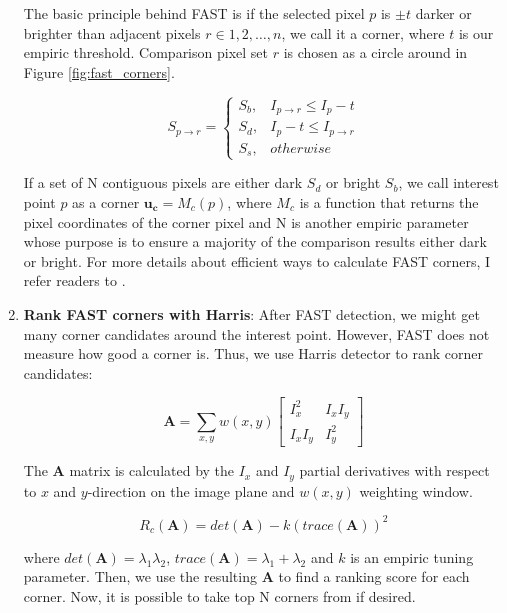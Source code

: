 \documentclass[12pt]{report}
\numberwithin{figure}{section}
\begin{document}
\begin{appendices}
\begin{enumerate}
	The basic principle behind FAST is if the selected pixel $p$ is $\pm t$ 
	darker or brighter than adjacent pixels $r\in{1,2,\dots,n}$, we call it a 
	corner, where $t$ is our empiric threshold. Comparison pixel set $r$ is 
	chosen as a circle around in Figure \ref{fig:fast_corners}.
	
	\begin{equation}
	S_{p \rightarrow r} = 
	\begin{cases}
	S_b, & I_{p \rightarrow r} \leq I_p - t \\
	S_d, & I_p - t \leq I_{p \rightarrow r} \\
	S_s, & otherwise
	\end{cases}
	\end{equation}
	
	If a set of N contiguous pixels are either dark $S_d$ or bright $S_b$, we 
	call interest point $p$ as a corner $\mathbf{u_c} = M_c(p)$, where $M_c$ 
	is a function that returns the pixel coordinates of the corner pixel and N 
	is another empiric parameter whose purpose is to ensure a majority of the 
	comparison results either dark or bright. For more details about efficient 
	ways to 
	calculate FAST corners, I refer readers to \parencite{Rosten2006}.
	
	\item \textbf{Rank FAST corners with Harris}: After FAST detection, we 
	might get many corner candidates around the interest point. However, FAST 
	does not measure how good a corner is. Thus, we use Harris detector to 
	rank corner candidates:
	
	\begin{equation}
	\mathbf{A} = \sum_{x,y} w(x,y) 
	\begin{bmatrix}
	I_x^2 & I_xI_y \\ I_xI_y & I_y^2
	\end{bmatrix}
	\end{equation}
	
	The $\mathbf{A}$ matrix is calculated by the $I_x$ and $I_y$ partial 
	derivatives with respect to $x$ and $y$-direction on the image plane and 
	$w(x,y)$ weighting window.
	
	\begin{equation}
	R_c(\mathbf{A}) = det(\mathbf{A}) - k(trace(\mathbf{A}))^2
	\end{equation}
	
	where $det(\mathbf{A}) = \lambda_1 \lambda_2$, $trace(\mathbf{A}) = 
	\lambda_1 + \lambda_2$ and $k$ is an empiric tuning parameter. Then, we 
	use the resulting $\mathbf{A}$ to find a ranking score for each corner. 
	Now, it is possible to take top N corners from if desired.
	

\end{enumerate}
\end{appendices}
\end{document}
